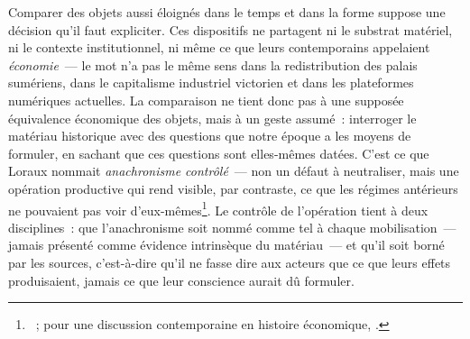 Comparer des objets aussi éloignés dans le temps et dans la forme suppose une décision qu'il faut expliciter. Ces dispositifs ne partagent ni le substrat matériel, ni le contexte institutionnel, ni même ce que leurs contemporains appelaient \emph{économie}~--- le mot n'a pas le même sens dans la redistribution des palais sumériens, dans le capitalisme industriel victorien et dans les plateformes numériques actuelles. La comparaison ne tient donc pas à une supposée équivalence économique des objets, mais à un geste assumé~: interroger le matériau historique avec des questions que notre époque a les moyens de formuler, en sachant que ces questions sont elles-mêmes datées. C'est ce que Loraux nommait \emph{anachronisme contrôlé}~--- non un défaut à neutraliser, mais une opération productive qui rend visible, par contraste, ce que les régimes antérieurs ne pouvaient pas voir d'eux-mêmes\footnote{\textcite{loraux_elogeanachronisme_1993}~; pour une discussion contemporaine en histoire économique, \textcite{monnet_perspectives_2025}.}. Le contrôle de l'opération tient à deux disciplines~: que l'anachronisme soit nommé comme tel à chaque mobilisation~--- jamais présenté comme évidence intrinsèque du matériau~--- et qu'il soit borné par les sources, c'est-à-dire qu'il ne fasse dire aux acteurs que ce que leurs effets produisaient, jamais ce que leur conscience aurait dû formuler.

